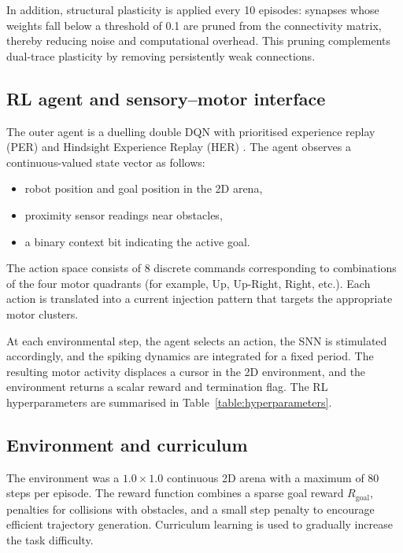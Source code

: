 \documentclass[journal]{IEEEtran}
\begin{document}
In addition, structural plasticity is applied every 10 episodes: synapses whose weights fall below a threshold of 0.1 are pruned from the connectivity matrix, thereby reducing noise and computational overhead. 
This pruning complements dual-trace plasticity by removing persistently weak connections.

\subsection{RL agent and sensory--motor interface}

The outer agent is a duelling double DQN with prioritised experience replay (PER) and Hindsight Experience Replay (HER) \cite{Wang2016dueling,Andrychowicz2017HER,VanHasselt2016}. 
The agent observes a continuous-valued state vector as follows:
\begin{itemize}
    \item robot position and goal position in the 2D arena,
    \item proximity sensor readings near obstacles,
    \item a binary context bit indicating the active goal.
\end{itemize}
The action space consists of $8$ discrete commands corresponding to combinations of the four motor quadrants (for example, Up, Up-Right, Right, etc.). 
Each action is translated into a current injection pattern that targets the appropriate motor clusters.

At each environmental step, the agent selects an action, the SNN is stimulated accordingly, and the spiking dynamics are integrated for a fixed period. 
The resulting motor activity displaces a cursor in the 2D environment, and the environment returns a scalar reward and termination flag. 
The RL hyperparameters are summarised in Table~\ref{table:hyperparameters}.

\subsection{Environment and curriculum}

The environment was a $1.0 \times 1.0$ continuous 2D arena with a maximum of 80 steps per episode. 
The reward function combines a sparse goal reward $R_{\mathrm{goal}}$, penalties for collisions with obstacles, and a small step penalty to encourage efficient trajectory generation. 
Curriculum learning is used to gradually increase the task difficulty.
\end{document}
